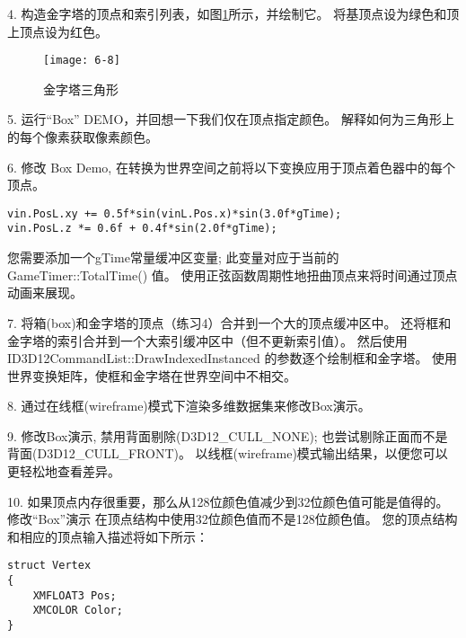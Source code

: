 \begin{flushleft}
\begin{flushleft}
4. 构造金字塔的顶点和索引列表，如图\ref{fig:6-8}所示，并绘制它。 将基顶点设为绿色和顶上顶点设为红色。\\
\end{flushleft}
\begin{figure}[h]
    \texttt{[image: 6-8]}
    \centering
    \caption{金字塔三角形}
    \label{fig:6-8}
\end{figure}
\begin{flushleft}
5. 运行“Box” DEMO，并回想一下我们仅在顶点指定颜色。 解释如何为三角形上的每个像素获取像素颜色。
\end{flushleft}


\begin{flushleft}
6. 修改 Box Demo, 在转换为世界空间之前将以下变换应用于顶点着色器中的每个顶点。
\end{flushleft}
\begin{lstlisting}
vin.PosL.xy += 0.5f*sin(vinL.Pos.x)*sin(3.0f*gTime);
vin.PosL.z *= 0.6f + 0.4f*sin(2.0f*gTime);
\end{lstlisting}
\begin{flushleft}
您需要添加一个gTime常量缓冲区变量; 此变量对应于当前的 GameTimer::TotalTime() 值。 使用正弦函数周期性地扭曲顶点来将时间通过顶点动画来展现。
\end{flushleft}

\begin{flushleft}
7. 将箱(box)和金字塔的顶点（练习4）合并到一个大的顶点缓冲区中。 还将框和金字塔的索引合并到一个大索引缓冲区中（但不更新索引值）。 然后使用 ID3D12CommandList::DrawIndexedInstanced 的参数逐个绘制框和金字塔。 使用世界变换矩阵，使框和金字塔在世界空间中不相交。
\end{flushleft}

\begin{flushleft}
8. 通过在线框(wireframe)模式下渲染多维数据集来修改Box演示。
\end{flushleft}

\begin{flushleft}
9. 修改Box演示, 禁用背面剔除(D3D12\_CULL\_NONE); 也尝试剔除正面而不是背面(D3D12\_CULL\_FRONT)。 以线框(wireframe)模式输出结果，以便您可以更轻松地查看差异。
\end{flushleft}

\begin{flushleft}
10. 如果顶点内存很重要，那么从128位颜色值减少到32位颜色值可能是值得的。修改“Box”演示 在顶点结构中使用32位颜色值而不是128位颜色值。 您的顶点结构和相应的顶点输入描述将如下所示：\\
\end{flushleft}
\begin{lstlisting}
struct Vertex
{
    XMFLOAT3 Pos;
    XMCOLOR Color;
}


\end{lstlisting}
\end{flushleft}
